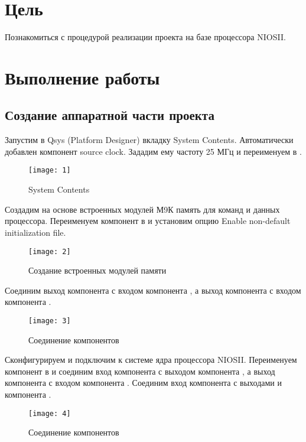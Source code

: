 





\tableofcontents
\lstlistoflistings
\listoffigures
\newpage

\section{Цель}

\noindent Познакомиться с процедурой реализации проекта на базе процессора NIOSII.

\section{Выполнение работы}

\subsection{Создание аппаратной части проекта}

Запустим в Qsys (Platform Designer) вкладку System Contents. Автоматически добавлен компонент source clock. Зададим ему частоту 25 МГц и переименуем в .
\begin{figure}[H]
	\centering
	\texttt{[image: 1]}
	\caption{System Contents}
\end{figure}

Создадим на основе встроенных модулей М9К память для команд и данных процессора. Переименуем компонент в  и установим опцию Enable non-default initialization file.
\begin{figure}[H]
	\centering
	\texttt{[image: 2]}
	\caption{Создание встроенных модулей памяти}
\end{figure}

Соединим выход  компонента  с входом  компонента , а выход  компонента  с входом  компонента .
\begin{figure}[H]
	\centering
	\texttt{[image: 3]}
	\caption{Соединение компонентов}
\end{figure}

Сконфигурируем и подключим к системе ядра процессора NIOSII. Переименуем компонент в  и соединим вход  компонента  с выходом  компонента , а выход  компонента  с входом  компонента . Соединим вход  компонента  с выходами  и  компонента .
\begin{figure}[H]
	\centering
	\texttt{[image: 4]}
	\caption{Соединение компонентов}
\end{figure}

